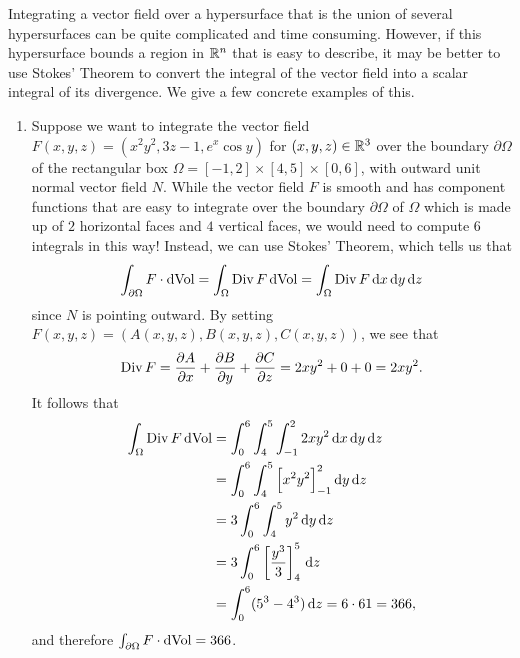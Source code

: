 Integrating a vector field over a hypersurface that is the union of several 
hypersurfaces can be quite complicated and time consuming. However, 
if this hypersurface bounds a region in $\mathbb{R}^n$ that is easy to describe, it 
may be better to use Stokes' Theorem to convert the integral of the 
vector field into a scalar integral of its divergence. We give a few concrete 
examples of this. 
\begin{enumerate}[(1)]
    \item Suppose we want to integrate the vector field $F(x, y, z) = 
    (x^2y^2, 3z-1, e^x\cos y)$ for $(x, y, z) \in \mathbb{R}^3$ over the boundary 
    $\partial\Omega$ of the rectangular box $\Omega = [-1, 2] \times [4, 5] 
    \times [0, 6]$, with outward unit normal vector field $N$. While the 
    vector field $F$ is smooth and has component functions that are 
    easy to integrate over the boundary $\partial\Omega$ of $\Omega$ 
    which is made up of $2$ horizontal faces and $4$ vertical faces, 
    we would need to compute $6$ integrals in this way! Instead, we can use 
    Stokes' Theorem, which tells us that 
    \[ \int_{\partial\Omega} F\cdot\operatorname{dVol} = \int_\Omega \operatorname{Div} F\operatorname{dVol} 
    = \int_\Omega \operatorname{Div} F \,\mathrm{d} x \,\mathrm{d} y \,\mathrm{d} z \] 
    since $N$ is pointing outward. By setting $F(x, y, z) = 
    (A(x, y, z), B(x, y, z), C(x, y, z))$, we see that 
    \[ \operatorname{Div} F = \frac{\partial A}{\partial x} + \frac{\partial B}{\partial y} 
    + \frac{\partial C}{\partial z} = 2xy^2 + 0 + 0 = 2xy^2. \] 
    It follows that 
    \begin{align*}
        \int_\Omega \operatorname{Div} F \operatorname{dVol} 
        &= \int_0^6 \int_4^5 \int_{-1}^2 2xy^2 \,\mathrm{d} x \,\mathrm{d} y \,\mathrm{d} z \\ 
        &= \int_0^6 \int_4^5 \Big[ x^2 y^2 \Big]_{-1}^2 \,\mathrm{d} y \,\mathrm{d} z \\ 
        &= 3 \int_0^6 \int_4^5 y^2 \,\mathrm{d} y \,\mathrm{d} z \\ 
        &= 3 \int_0^6 \left[ \frac{y^3}{3} \right]_4^5 \,\mathrm{d} z \\ 
        &= \int_0^6 (5^3 - 4^3)\,\mathrm{d} z = 6 \cdot 61 = 366,
    \end{align*}
    and therefore $\int_{\partial\Omega} F \cdot \operatorname{dVol} = 366$. 


\end{enumerate}
